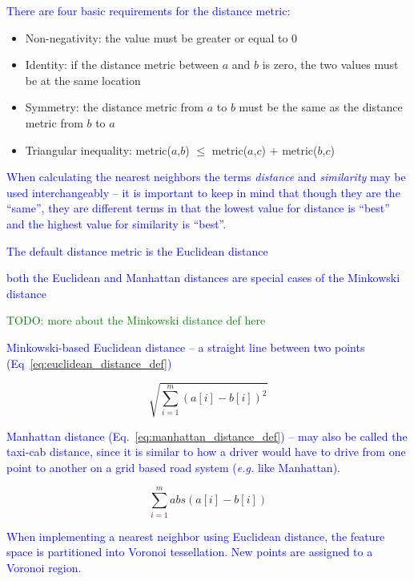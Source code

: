 \textcolor{blue}{There are four basic requirements for the distance metric:}

\begin{itemize}
	\item Non-negativity: the value must be greater or equal to 0
	\item Identity: if the distance metric between $a$ and $b$ is zero, the two values must be at the same location
	\item Symmetry: the distance metric from $a$ to $b$ must be the same as the distance metric from $b$ to $a$
	\item Triangular inequality: metric($a$,$b$) $\le$ metric($a$,$c$) $+$ metric($b$,$c$)
\end{itemize}

\textcolor{blue}{When calculating the nearest neighbors the terms \textit{distance} and \textit{similarity} may be used interchangeably -- it is important to keep in mind that though they are the ``same'', they are different terms in that the lowest value for distance is ``best'' and the highest value for similarity is ``best''.}

\textcolor{blue}{The default distance metric is the Euclidean distance}

\textcolor{blue}{both the Euclidean and Manhattan distances are special cases of the Minkowski distance}

\textcolor{green}{TODO: more about the Minkowski distance def here}

\textcolor{blue}{Minkowski-based Euclidean distance -- a straight line between two points (Eq~\ref{eq:euclidean_distance_def})}

\begin{equation}
{\sqrt{\sum_{i=1}^{m}{{(a[i] - b[i])}^2}}}
\label{eq:euclidean_distance_def}
\end{equation}


\textcolor{blue}{Manhattan distance (Eq.~\ref{eq:manhattan_distance_def}) -- may also be called the taxi-cab distance, since it is similar to how a driver would have to drive from one point to another on a grid based road system (\textit{e.g.} like Manhattan).}

\begin{equation}
{\sum_{i=1}^{m}{abs(a[i] - b[i])}}
\label{eq:manhattan_distance_def}
\end{equation}

\textcolor{blue}{When implementing a nearest neighbor using Euclidean distance, the feature space is partitioned into {Voronoi tessellation}. New points are assigned to a {Voronoi region}.}

